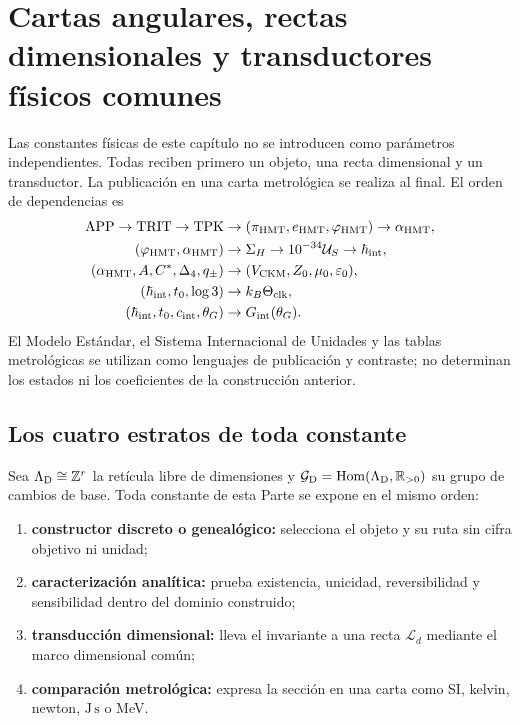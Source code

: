 \chapter[Cartas dimensionales y transductores físicos]{Cartas angulares,
rectas dimensionales y transductores físicos comunes}
\label{chap:constantes-fisicas-genealogia-ampliacion-20260818}

Las constantes físicas de este capítulo no se introducen como parámetros
independientes. Todas reciben primero un objeto, una recta dimensional y un
transductor. La publicación en una carta metrológica se realiza al final. El
orden de dependencias es
\begin{equation}
 \label{eq:amp18-constantes-grafo-inicial}
 \begin{aligned}
 \mathrm{APP}\to\mathrm{TRIT}\to\mathrm{TPK}
 &\to(\pi_{\rm HMT},e_{\rm HMT},\varphi_{\rm HMT})
 \to\alpha_{\rm HMT},\\
 (\varphi_{\rm HMT},\alpha_{\rm HMT})
 &\to\Sigma_H\to10^{-34}\mathcal U_S
 \to\hbar_{\rm int},\\
 (\alpha_{\rm HMT},A,C^*,\Delta_4,q_\pm)
 &\to (V_{\rm CKM},Z_0,\mu_0,\varepsilon_0),\\
 (\hbar_{\rm int},t_0,\log3)
 &\to k_B\Theta_{\rm clk},\\
 (\hbar_{\rm int},t_0,c_{\rm int},\theta_G)
 &\to G_{\rm int}(\theta_G).
 \end{aligned}
\end{equation}
El Modelo Estándar, el Sistema Internacional de Unidades y las tablas
metrológicas se utilizan como lenguajes de publicación y contraste; no
determinan los estados ni los coeficientes de la construcción anterior.

\section{Los cuatro estratos de toda constante}

Sea \(\Lambda_{\rm D}\cong\mathbb Z^r\) la retícula libre de dimensiones y
\(\mathcal G_{\rm D}=\operatorname{Hom}(\Lambda_{\rm D},\mathbb R_{>0})\)
su grupo de cambios de base. Toda constante de esta Parte se expone en el
mismo orden:
\begin{enumerate}
 \item \textbf{constructor discreto o genealógico:} selecciona el objeto y
 su ruta sin cifra objetivo ni unidad;
 \item \textbf{caracterización analítica:} prueba existencia, unicidad,
 reversibilidad y sensibilidad dentro del dominio construido;
 \item \textbf{transducción dimensional:} lleva el invariante a una recta
 \(\mathcal L_d\) mediante el marco dimensional común;
 \item \textbf{comparación metrológica:} expresa la sección en una carta
 como SI, kelvin, newton, \(\mathrm{J\,s}\) o MeV.
\end{enumerate}

